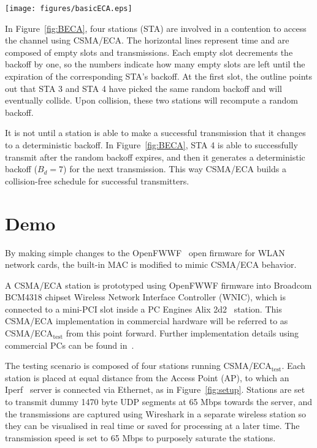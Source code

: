 \documentclass[conference]{IEEEtran}
\begin{document}
	\begin{figure*}[tb]
		\centering
		\texttt{[image: figures/basicECA.eps]}
		\caption{CSMA/ECA with four stations in saturation. ($B_{d}=7$.)}
		\label{fig:BECA}
	\end{figure*}

In Figure~\ref{fig:BECA}, four stations (STA) are involved in a contention to access the channel using CSMA/ECA. The horizontal lines represent time and are composed of empty slots and transmissions. Each empty slot decrements the backoff by one, so the numbers indicate how many empty slots are left until the expiration of the corresponding STA's backoff. At the first slot, the outline points out that STA 3 and STA 4 have picked the same random backoff and will eventually collide. Upon collision, these two stations will recompute a random backoff.

It is not until a station is able to make a successful transmission that it changes to a deterministic backoff. In Figure~\ref{fig:BECA}, STA 4 is able to successfully transmit after the random backoff expires, and then it generates a deterministic backoff ($B_{d}=7$) for the next transmission. This way CSMA/ECA builds a collision-free schedule for successful transmitters.

\section{Demo}\label{prototype}
By making simple changes to the OpenFWWF~\cite{OpenFWWF} open firmware for WLAN network cards, the built-in MAC is modified to mimic CSMA/ECA behavior.


A CSMA/ECA station is prototyped using OpenFWWF firmware into Broadcom BCM4318 chipset Wireless Network Interface Controller (WNIC), which is connected to a mini-PCI slot inside a PC Engines Alix 2d2~\cite{Alix2d2} station. This CSMA/ECA implementation in commercial hardware will be referred to as CSMA/ECA$_{\text{test}}$ from this point forward. Further implementation details using commercial PCs can be found in~\cite{BECA-test}.

	The testing scenario is composed of four stations running CSMA/ECA$_{\text{test}}$. Each station is placed at equal distance from the Access Point (AP), to which an Iperf~\cite{tirumala2005iperf} server is connected via Ethernet, as in Figure~\ref{fig:setup}. Stations are set to transmit dummy 1470 byte UDP segments at 65 Mbps towards the server, and the transmissions are captured using Wireshark in a separate wireless station so they can be visualised in real time or saved for processing at a later time. The transmission speed is set to 65 Mbps to purposely saturate the stations.
	
\end{document}

